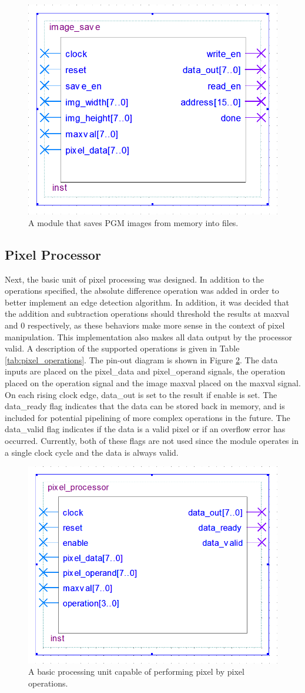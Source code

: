 \documentclass[a4paper, 10pt, titlepage]{article}
\begin{document}
\begin{figure}
    \centering
    \includegraphics[width=0.5\linewidth]{image_save_entity.PNG}
    \caption{A module that saves PGM images from memory into files.}
    \label{fig:image_save}
\end{figure}

\subsection{Pixel Processor}

Next, the basic unit of pixel processing was designed. In addition to the operations specified, the absolute difference operation was added in order to better implement an edge detection algorithm. In addition, it was decided that the addition and subtraction operations should threshold the results at maxval and 0 respectively, as these behaviors make more sense in the context of pixel manipulation. This implementation also makes all data output by the processor valid. A description of the supported operations is given in Table \ref{tab:pixel_operations}. The pin-out diagram is shown in Figure \ref{fig:pixel_processor}. The data inputs are placed on the pixel\_data and pixel\_operand signals, the operation placed on the operation signal and the image maxval placed on the maxval signal. On each rising clock edge, data\_out is set to the result if enable is set. The data\_ready flag indicates that the data can be stored back in memory, and is included for potential pipelining of more complex operations in the future. The data\_valid flag indicates if the data is a valid pixel or if an overflow error has occurred. Currently, both of these flags are not used since the module operates in a single clock cycle and the data is always valid.

\begin{figure}
    \centering
    \includegraphics[width=0.5\linewidth]{pixel_processor_entity.PNG}
    \caption{A basic processing unit capable of performing pixel by pixel operations.}
    \label{fig:pixel_processor}
\end{figure}
\end{document}
